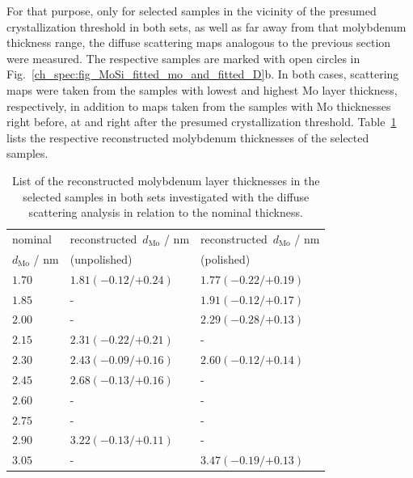 For that purpose, only for selected samples in the vicinity of the presumed crystallization threshold in both sets, as well as far away from that molybdenum thickness range, the diffuse scattering maps analogous to the previous section were measured. The respective samples are marked with open circles in Fig.~\ref{ch_spec:fig_MoSi_fitted_mo_and_fitted_D}b. In both cases, scattering maps were taken from the samples with lowest and highest Mo layer thickness, respectively, in addition to maps taken from the samples with Mo thicknesses right before, at and right after the presumed crystallization threshold. Table~\ref{ch_diff:tbl_mo_si_thickness_mcmc_result_selected_samples} lists the respective reconstructed molybdenum thicknesses of the selected samples.
\begin{table}[htbp]
\centering
\caption{List of the reconstructed molybdenum layer thicknesses in the selected samples in both sets investigated with the diffuse scattering analysis in relation to the nominal thickness.}
\label{ch_diff:tbl_mo_si_thickness_mcmc_result_selected_samples}
\begin{tabular}{@{}lll@{}}
\toprule
nominal &reconstructed~$d_\text{Mo}$ / nm&reconstructed~$d_\text{Mo}$ / nm\\ 
$d_\text{Mo}$ / nm&(unpolished) & (polished) \\
\midrule
$1.70$ &$1.81({-0.12}/{+0.24})$  &$1.77({-0.22}/{+0.19})$ \\
$1.85$ &-  &$1.91({-0.12}/{+0.17})$ \\
$2.00$ &-  &$2.29({-0.28}/{+0.13})$ \\
$2.15$ &$2.31({-0.22}/{+0.21})$  &- \\
$2.30$ &$2.43({-0.09}/{+0.16})$   &$2.60({-0.12}/{+0.14})$ \\
$2.45$ &$2.68({-0.13}/{+0.16})$  &- \\
$2.60$ &- &- \\
$2.75$ &-  &- \\
$2.90$ &$3.22({-0.13}/{+0.11})$ &- \\
$3.05$ &-  & $3.47({-0.19}/{+0.13})$ \\
 \bottomrule
\end{tabular}
\end{table}

